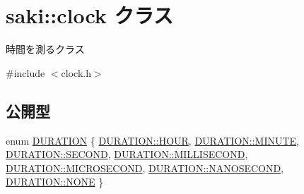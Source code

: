 \hypertarget{classsaki_1_1clock}{}\section{saki\+:\+:clock クラス}
\label{classsaki_1_1clock}


時間を測るクラス  




{\ttfamily \#include $<$clock.\+h$>$}

\subsection*{公開型}
\begin{DoxyCompactItemize}
\item 
enum \mbox{\hyperlink{classsaki_1_1clock_a33900ca0b3320bafb061928ad6827bdf}{D\+U\+R\+A\+T\+I\+ON}} \{ \newline
\mbox{\hyperlink{classsaki_1_1clock_a33900ca0b3320bafb061928ad6827bdfadd3f965174e8bb2f64523981626ced1a}{D\+U\+R\+A\+T\+I\+O\+N\+::\+H\+O\+UR}}, 
\mbox{\hyperlink{classsaki_1_1clock_a33900ca0b3320bafb061928ad6827bdfa46bda4cde2f10bdb9e51e3bbefa4a2bf}{D\+U\+R\+A\+T\+I\+O\+N\+::\+M\+I\+N\+U\+TE}}, 
\mbox{\hyperlink{classsaki_1_1clock_a33900ca0b3320bafb061928ad6827bdfa2200becb80f0019c4a2ccecec350d0db}{D\+U\+R\+A\+T\+I\+O\+N\+::\+S\+E\+C\+O\+ND}}, 
\mbox{\hyperlink{classsaki_1_1clock_a33900ca0b3320bafb061928ad6827bdfa241d7907de05ad50c011812e927cd671}{D\+U\+R\+A\+T\+I\+O\+N\+::\+M\+I\+L\+L\+I\+S\+E\+C\+O\+ND}}, 
\newline
\mbox{\hyperlink{classsaki_1_1clock_a33900ca0b3320bafb061928ad6827bdfa52a3ae8e5d772e28d4e2105fefd2eed1}{D\+U\+R\+A\+T\+I\+O\+N\+::\+M\+I\+C\+R\+O\+S\+E\+C\+O\+ND}}, 
\mbox{\hyperlink{classsaki_1_1clock_a33900ca0b3320bafb061928ad6827bdfaeb8c6d69310ffef899148b680e672652}{D\+U\+R\+A\+T\+I\+O\+N\+::\+N\+A\+N\+O\+S\+E\+C\+O\+ND}}, 
\mbox{\hyperlink{classsaki_1_1clock_a33900ca0b3320bafb061928ad6827bdfab50339a10e1de285ac99d4c3990b8693}{D\+U\+R\+A\+T\+I\+O\+N\+::\+N\+O\+NE}}
 \}
\end{DoxyCompactItemize}
